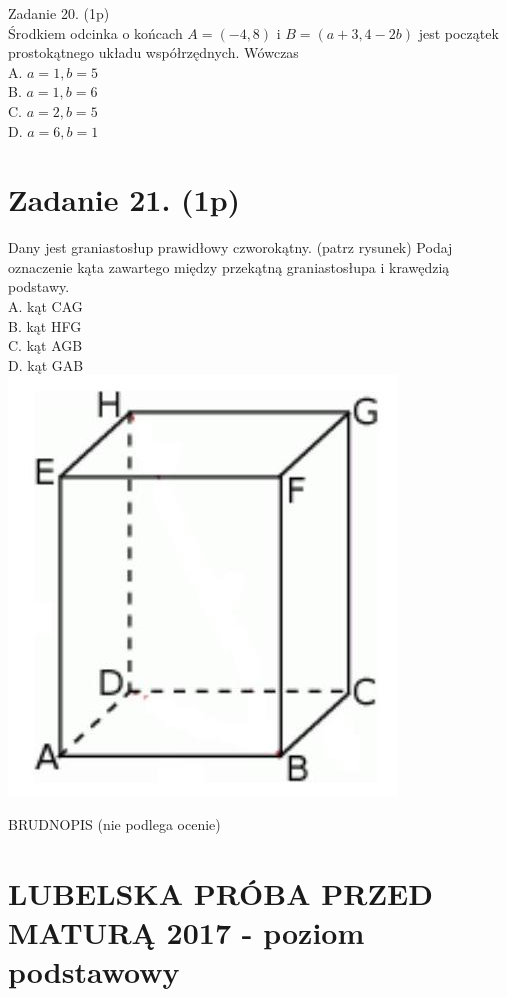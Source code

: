 \documentclass[10pt]{article}
\begin{document}
Zadanie 20. (1p)\\
Środkiem odcinka o końcach \(A=(-4,8)\) i \(B=(a+3,4-2 b)\) jest początek prostokątnego układu współrzędnych. Wówczas\\
A. \(a=1, b=5\)\\
B. \(a=1, b=6\)\\
C. \(a=2, b=5\)\\
D. \(a=6, b=1\)

\section*{Zadanie 21. (1p)}
Dany jest graniastosłup prawidłowy czworokątny. (patrz rysunek) Podaj oznaczenie kąta zawartego między przekątną graniastosłupa i krawędzią podstawy.\\
A. kąt CAG\\
B. kąt HFG\\
C. kąt AGB\\
D. kąt GAB\\
\includegraphics[max width=\textwidth, center]{2024_11_21_d45b0573b36a3462565cg-06}

BRUDNOPIS (nie podlega ocenie)

\section*{LUBELSKA PRÓBA PRZED MATURĄ 2017 - poziom podstawowy}
\end{document}
